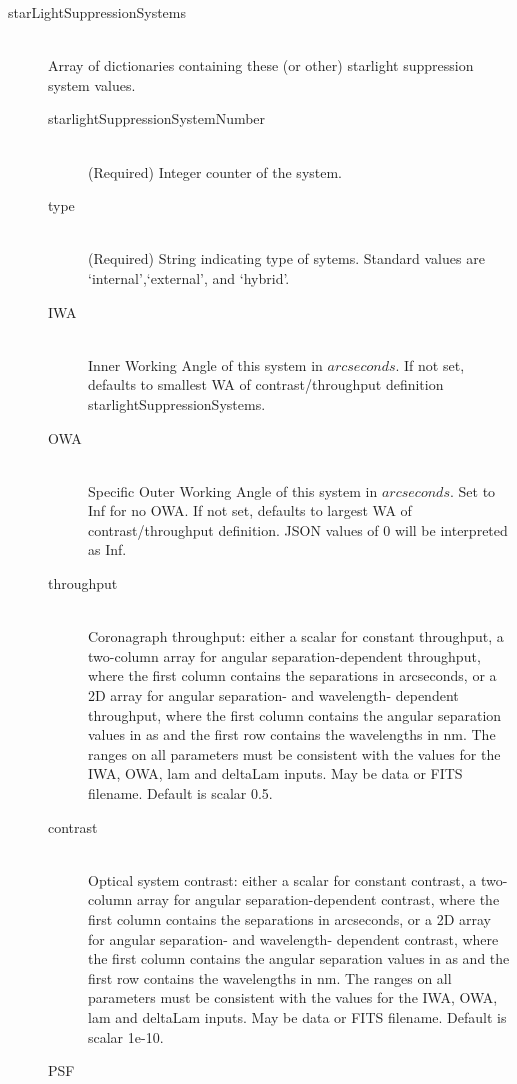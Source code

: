 \documentclass[cleanfoot]{asme2ej}
\begin{document}
\begin{description}
    \item[starLightSuppressionSystems] \hfill\\ Array of dictionaries containing these (or other) starlight suppression system values.
    \begin{description}
    \item[starlightSuppressionSystemNumber] \hfill\\ (Required) Integer counter of the system.
    \item[type] \hfill\\ (Required) String indicating type of sytems.  Standard values are `internal',`external', and `hybrid'.
    \item[IWA] \hfill \\
     Inner Working Angle of this system in $ arcseconds $.  If not set, defaults to smallest WA of contrast/throughput definition starlightSuppressionSystems.
    \item[OWA] \hfill \\
    Specific Outer Working Angle of this system in $ arcseconds $. Set to Inf for no OWA. If not set, defaults to largest WA of contrast/throughput definition.  JSON values of 0 will be interpreted as Inf.
    \item[throughput] \hfill \\
    Coronagraph throughput: either a scalar for constant throughput, a two-column array for angular separation-dependent throughput, where the first column contains the separations in arcseconds, or a 2D array for angular separation- and wavelength- dependent throughput, where the first column contains the angular separation values in as and the first row contains the wavelengths in nm.  The ranges on all parameters must be consistent with the values for the IWA, OWA, lam and deltaLam inputs.  May be data or FITS filename. Default is scalar 0.5.
    \item[contrast] \hfill \\
    Optical system contrast: either a scalar for constant contrast, a two-column array for angular separation-dependent contrast, where the first column contains the separations in arcseconds, or a 2D array for angular separation- and wavelength- dependent contrast, where the first column contains the angular separation values in as and the first row contains the wavelengths in nm.  The ranges on all parameters must be consistent with the values for the IWA, OWA, lam and deltaLam inputs. May be data or FITS filename. Default is scalar 1e-10.
    \item[PSF] \hfill \\

\end{description}
\end{description}
\end{document}
